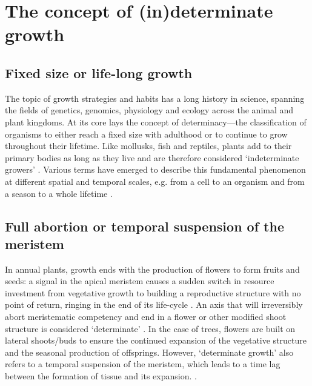 \documentclass{article}
\begin{document}
	
\section*{The concept of (in)determinate growth}
	\subsection*{Fixed size or life-long growth}
	The topic of growth strategies and habits has a long history in science, spanning the fields of genetics, genomics, physiology and ecology across the animal and plant kingdoms. At its core lays the concept of determinacy---the classification of organisms to either reach a fixed size with adulthood or to continue to grow throughout their lifetime. Like mollusks, fish and reptiles, plants add to their primary bodies as long as they live and are therefore considered `indeterminate growers' \citep{ejsmondHowTimeGrowth2010}. Various terms have emerged to describe this fundamental phenomenon at different spatial and temporal scales, e.g. from a cell to an organism and from a season to a whole lifetime \citep{mcdanielInductionDeterminationDevelopmental1992a, karkachTrajectoriesModelsIndividual2006}. \\

	\subsection*{Full abortion or temporal suspension of the meristem}
	In annual plants, growth ends with the production of flowers to form fruits and seeds: a signal in the apical meristem causes a sudden switch in resource investment from vegetative growth to building a reproductive structure with no point of return, ringing in the end of its life-cycle \citep{poethigPhaseChangeRegulation2003, huijserControlDevelopmentalPhase2011}. An axis that will irreversibly abort meristematic competency and end in a flower or other modified shoot structure is considered `determinate' \citep{barthelemyPlantArchitectureDynamic2007}. In the case of trees, flowers are built on lateral shoots/buds to ensure the continued expansion of the vegetative structure and the seasonal production of offsprings. However, `determinate growth' also refers to a temporal suspension of the meristem, which leads to a time lag between the formation of tissue and its expansion. \citep{kozlowskiSeedGerminationOntogeny2012, halleTropicalTreesForests1978}. %
	
\end{document}
